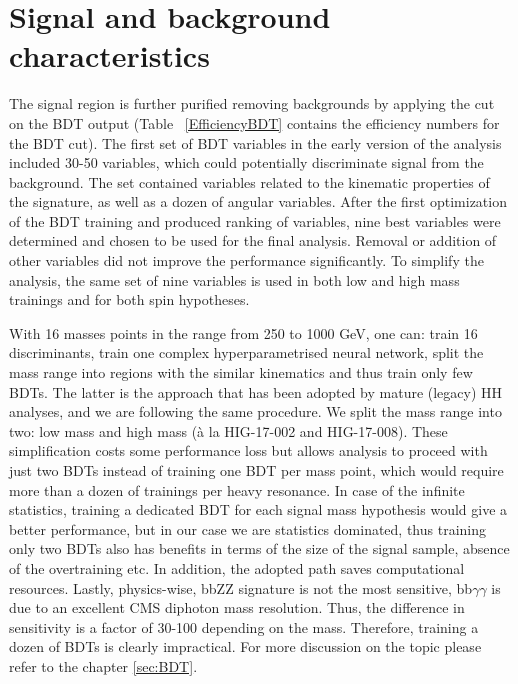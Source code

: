%
%
%


\section{Signal and background characteristics}

The signal region is further purified removing backgrounds by applying the cut on the BDT
output (Table ~\ref{EfficiencyBDT} contains the efficiency numbers for the BDT cut). 
The first set of BDT variables in the early version of the analysis included 30-50 variables, which could potentially discriminate signal from the background. The set contained variables related to the kinematic properties of the signature, as well as a dozen of angular variables. After the first optimization of the BDT training and produced ranking of variables, nine best variables were determined and chosen to be used for the final analysis. Removal or addition of other variables did not improve the performance significantly. To simplify the analysis, the same set of nine variables is used in both low and high mass trainings and for both spin hypotheses.

With 16 masses points in the range from 250 to 1000 GeV, one can: train 16 discriminants, train one complex hyperparametrised neural network, split the mass range into regions with the similar kinematics and thus train only few BDTs. The latter is the approach that has been adopted by mature (legacy) HH analyses, and we are following the same procedure. We split the mass range into two: low mass and high mass (\`a la HIG-17-002 and HIG-17-008). These simplification costs some performance loss but allows analysis to proceed with just two BDTs instead of training one BDT per mass point, which would require more than a dozen of trainings per heavy resonance. In case of the infinite statistics, training a dedicated BDT for each
signal mass hypothesis would give a better performance, but in our case we are statistics dominated, thus training only two BDTs also has benefits in terms of the size of the signal sample, absence of the overtraining etc. In addition, the adopted path saves computational resources. Lastly, physics-wise, bbZZ signature is not the most sensitive, bb$\gamma$$\gamma$ is due to an excellent CMS diphoton mass resolution. Thus, the difference in sensitivity is a factor of 30-100 depending on the mass. Therefore, training a dozen of BDTs is clearly impractical. For more discussion on the topic please refer to the chapter \ref{sec:BDT}.





